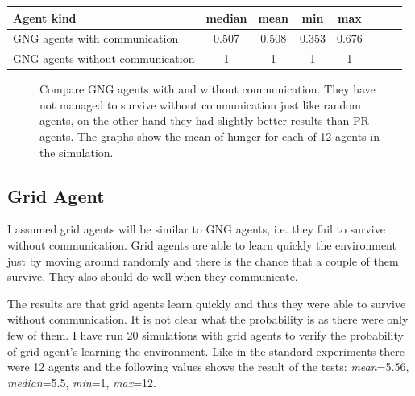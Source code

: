\begin{center}   
  \begin{tabular}{l*{6}{c}r}
  Agent kind        & median & mean & min & max \\
  \hline  
  GNG agents with communication        & 0.507 & 0.508 & 0.353 & 0.676 \\
  GNG agents without communication        & 1 & 1 & 1 & 1 \\
  \end{tabular}                  
\end{center}


\begin{figure}[h!]
  \centering      
  \caption{Compare GNG agents with and without communication. They have not managed to survive without communication just like random agents, on the other hand they had slightly better results than PR agents. The graphs show the mean of hunger for each of 12 agents in the simulation.}
\end{figure} 

\clearpage

\subsection{Grid Agent}            

I assumed grid agents will be similar to GNG agents, i.e. they fail to survive without communication. Grid agents are able to learn quickly the environment just by moving around randomly and there is the chance that a couple of them survive. They also should do well when they communicate. 

The results are that grid agents learn quickly and thus they were able to survive without communication. It is not clear what the probability is as there were only few of them. I have run 20 simulations with grid agents to verify the probability of grid agent's learning the environment. Like in the standard experiments there were 12 agents and the following values shows the result of the tests: \emph{mean}=5.56, \emph{median}=5.5, \emph{min}=1, \emph{max}=12. 

